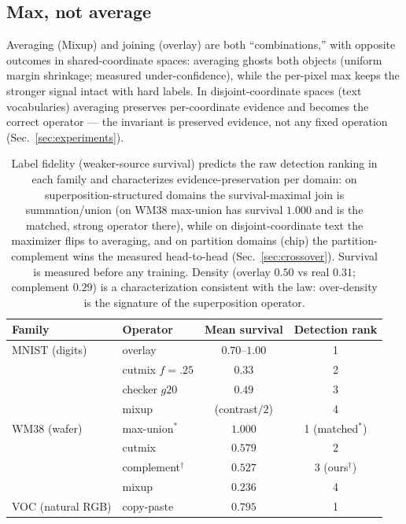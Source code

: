 \documentclass[11pt]{article}
\begin{document}
\subsection{Max, not average}

Averaging (Mixup) and joining (overlay) are both ``combinations,'' with
opposite outcomes in shared-coordinate spaces: averaging ghosts both
objects (uniform margin shrinkage; measured under-confidence), while the
per-pixel max keeps the stronger signal intact with hard labels. In
disjoint-coordinate spaces (text vocabularies) averaging preserves
per-coordinate evidence and becomes the correct operator --- the invariant
is preserved evidence, not any fixed operation
(Sec.~\ref{sec:experiments}).

\begin{table}[t]
\centering
\caption{Label fidelity (weaker-source survival) predicts the raw detection ranking
in each family and characterizes evidence-preservation per domain: on
superposition-structured domains the survival-maximal join is summation/union (on
WM38 max-union has survival $1.000$ and is the matched, strong operator there), while
on disjoint-coordinate text the maximizer flips to averaging, and on partition domains
(chip) the partition-complement wins the measured head-to-head
(Sec.~\ref{sec:crossover}). Survival is measured before any training. Density
(overlay $0.50$ vs real $0.31$; complement $0.29$) is a characterization consistent
with the law: over-density is the signature of the superposition operator.}
\label{tab:fidelity}
\begin{tabular}{llcc}
\toprule
Family & Operator & Mean survival & Detection rank \\
\midrule
MNIST (digits)   & overlay        & $0.70$--$1.00$ & 1 \\
                 & cutmix $f{=}.25$ & $0.33$       & 2 \\
                 & checker $g20$  & $0.49$         & 3 \\
                 & mixup          & (contrast$/2$) & 4 \\
\midrule
WM38 (wafer)     & max-union$^{\ast}$ & $1.000$    & 1 (matched$^{\ast}$) \\
                 & cutmix         & $0.579$        & 2 \\
                 & complement$^{\dagger}$ & $0.527$ & 3 (ours$^{\dagger}$) \\
                 & mixup          & $0.236$        & 4 \\
\midrule
VOC (natural RGB)& copy-paste     & $0.795$        & 1 \\

\end{tabular}
\end{table}
\end{document}
